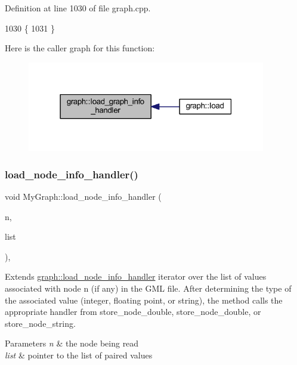 Definition at line 1030 of file graph.\+cpp.


\begin{DoxyCode}
1030                                                 \{
1031 \}
\end{DoxyCode}
Here is the caller graph for this function\+:
\nopagebreak
\begin{figure}[H]
\begin{center}
\leavevmode
\includegraphics[width=295pt]{classgraph_aaca9ede8005388fd22b56e12280bf1bf_icgraph}
\end{center}
\end{figure}
\mbox{\label{class_my_graph_acef355f66e5aeb19265a9860f2920381}} 
\subsubsection{\texorpdfstring{load\+\_\+node\+\_\+info\+\_\+handler()}{load\_node\_info\_handler()}}
{\footnotesize\ttfamily void My\+Graph\+::load\+\_\+node\+\_\+info\+\_\+handler (\begin{DoxyParamCaption}\item[{\mbox{\hyperlink{classnode}{node}}}]{n,  }\item[{\mbox{\hyperlink{struct_g_m_l__pair}{G\+M\+L\+\_\+pair}} $\ast$}]{list }\end{DoxyParamCaption})\hspace{0.3cm}{\ttfamily [virtual]}, {\ttfamily [inherited]}}

Extends \mbox{\hyperlink{classgraph_ae956c361413410987a54e2296af2572f}{graph\+::load\+\_\+node\+\_\+info\+\_\+handler}} iterator over the list of values associated with node {\ttfamily n} (if any) in the G\+ML file. After determining the type of the associated value (integer, floating point, or string), the method calls the appropriate handler from store\+\_\+node\+\_\+double, store\+\_\+node\+\_\+double, or store\+\_\+node\+\_\+string. 
\begin{DoxyParams}{Parameters}
{\em n} & the node being read \\
\hline
{\em list} & pointer to the list of paired values \\
\hline
\end{DoxyParams}



